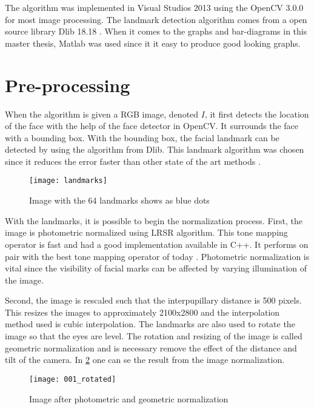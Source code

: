 The algorithm was implemented in Visual Studios 2013 using the OpenCV 3.0.0 \cite{opencv} for most image processing. The landmark detection algorithm comes from a open source library Dlib 18.18 \cite{dlib09}. When it comes to the graphs and bar-diagrams in this master thesis, Matlab \cite{MATLAB:2010} was used since it it easy to produce good looking graphs.   

\section{Pre-processing}

When the algorithm is given a RGB image, denoted $I$, it first detects the location of the face with the help of the face detector in OpenCV. It surrounds the face with a bounding box. With the bounding box, the facial landmark can be detected by using the algorithm from Dlib. This landmark algorithm was chosen since it reduces the error faster than other state of the art methods \cite{dlib_landmark}. 

\FloatBarrier
\begin{figure}[!h]
	\centering
	\texttt{[image: landmarks]}
	\caption{Image with the 64 landmarks shows as blue dots \label{fig:landmarks}}
\end{figure}
\FloatBarrier

With the landmarks, it is possible to begin the normalization process. First, the image is photometric normalized using LRSR algorithm. This tone mapping operator is fast and had a good implementation available in C++. It performs on pair with the best tone mapping operator of today \cite{badger}. Photometric normalization is vital since the visibility of facial marks can be affected by varying illumination of the image.  

Second, the image is rescaled such that the interpupillary distance is 500 pixels. This resizes the images to approximately 2100x2800 and the interpolation method used is cubic interpolation. The landmarks are also used to rotate the image so that the eyes are level. The rotation and resizing of the image is called geometric normalization and is necessary remove the effect of the distance and tilt of the camera. In \cref{fig:rotated_img} one can se the result from the image normalization. 

\FloatBarrier
\begin{figure}[!h]
	\centering
	\texttt{[image: 001\_rotated]}
	\caption{Image after photometric and geometric normalization \label{fig:rotated_img}}
\end{figure}
\FloatBarrier

